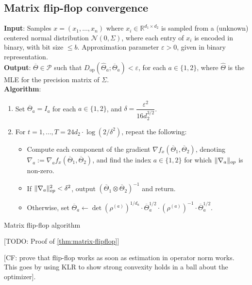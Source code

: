 \documentclass[aos]{imsart}
\theoremstyle{definition}
\numberwithin{equation}{section}
\DeclareMathOperator{\op}{op}
\DeclarePairedDelimiter{\norm}{\lVert}{\rVert}
\newcommand{\R}{{\mathbb{R}}}
\newcommand{\otheta}{\overline{\Theta}}
\newcommand{\htheta}{\widehat{\Theta}}
\newcommand{\eps}{\varepsilon}
\newcommand{\cN}{\mathcal{N}}
\newcommand{\SPD}{\mathcal{P}}
\newcommand{\samp}{x}
\newcommand{\CF}[1]{{\color{purple}[CF: #1]}}
\newcommand{\TODO}[1]{{\color{blue}[TODO: #1]}}
\begin{document}
\subsection{Matrix flip-flop convergence}
\begin{Algorithm}
\textbf{Input}: Samples $\samp = (\samp_1, \ldots, \samp_n)$ where $\samp_i \in \R^{d_1 \times d_2}$ is sampled from a (unknown) centered normal distribution $\cN(0, \Sigma)$, where each entry of $\samp_i$ is encoded in binary, with bit size $\le b$. Approximation parameter $\eps > 0$, given in binary representation. \\[.3ex]

\textbf{Output}: $\otheta \in \SPD$ such that $D_{\op}(\htheta_a; \otheta_a) < \eps$, for each $a \in \{1,2\}$, where $\htheta$ is the MLE for the precision matrix of $\Sigma$. \\[.3ex]

\textbf{Algorithm}:
\begin{enumerate}
\item\label{it:flip-flop step 1} Set $\otheta_a = I_a$ for each $a \in \{1,2\}$, and $\delta = \dfrac{\eps^2}{16 d_2^{3/2}}$.
\item\label{it:flip-flop step 2} For $t=1,\dots,T = 24 d_2 \cdot \log(2/\delta^2)$, repeat the following:
\begin{itemize}
\item Compute each component of the gradient $\nabla f_{\samp}(\otheta_1, \otheta_2)$, denoting $\nabla_a := \nabla_a f_{\samp}(\otheta_1, \otheta_2)$, and find the index $a \in \{1,2\}$ for which $\norm{\nabla_a}_{op}$ is non-zero.
\item
If $\norm{\nabla_a}_{op}^2 < \delta^2$, output $\left( \otheta_1 \otimes \otheta_2 \right)^{-1}$ and return.
\item Otherwise, set $\otheta_a \leftarrow \det(\rho^{(a)})^{1/d_a} \cdot \otheta_a^{1/2} \cdot (\rho^{(a)})^{-1} \cdot \otheta_a^{1/2}$.
\end{itemize}
\end{enumerate}
\caption{Matrix flip-flop algorithm}\label{alg:flip-flop}
\end{Algorithm}

\TODO{Proof of \cref{thm:matrix-flipflop}}


\CF{prove that flip-flop works as soon as estimation in operator norm works. This goes by using KLR to show strong convexity holds in a ball about the optimizer}.
\end{document}
